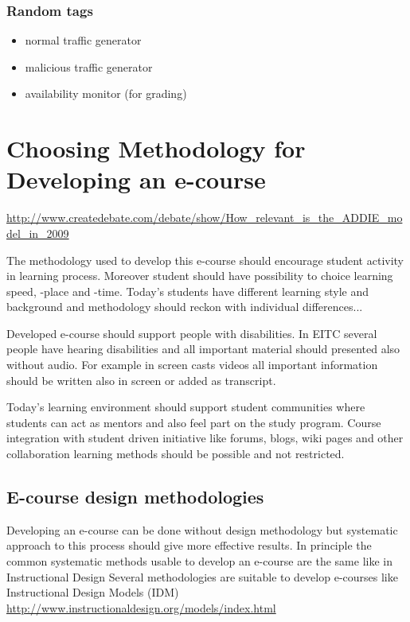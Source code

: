 \subsubsection{Random tags}
\begin{itemize}
	\item normal traffic generator
	\item malicious traffic generator
	\item availability monitor (for grading)
\end{itemize}


\section{Choosing Methodology for Developing an e-course}

\url{http://www.createdebate.com/debate/show/How_relevant_is_the_ADDIE_model_in_2009}

The methodology used to develop this e-course should encourage student activity in learning process. Moreover student should have possibility to choice learning speed, -place and -time. Today's students have different learning style and background and methodology should reckon with individual differences...

Developed e-course should support people with disabilities. In \gls{EITC} several people have hearing disabilities and all important material should presented also without audio. For example in screen casts videos all important information should be written also in screen or added as transcript.

Today’s learning environment should support student communities where students can act as mentors and also feel part on the study program. Course integration with student driven initiative like forums, blogs, wiki pages and other collaboration learning methods should be possible and not restricted.

\subsection{E-course design methodologies}
Developing an e-course can be done without design methodology but systematic approach to this process should give more effective results. In principle the common systematic methods usable to develop an e-course are the same like in Instructional Design 
Several methodologies are suitable to develop e-courses like Instructional Design Models (IDM)
\url{http://www.instructionaldesign.org/models/index.html}


